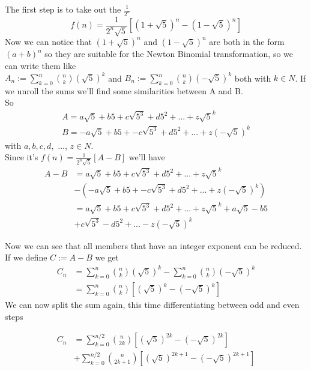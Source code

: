 \documentclass[amsmath,amssymb,aps,pra,reprint,groupedaddress,showpacs]{revtex4-1}
\begin{document}
The first step is to take out the $\frac{1}{2^n}$
$$f(n) = \frac{1}{2^n\sqrt{5}} \left[ \left( 1+\sqrt{5} \right) ^n - \left( 1-\sqrt{5} \right)^n \right]$$
Now we can notice that $(1 + \sqrt{5})^n$ and $(1 - \sqrt{5})^n$ are both in the form $(a + b)^n$ so they are suitable for the Newton Binomial transformation,
so we can write them like \\
$ A_n:= \sum_{k=0}^n \binom{n}{k} \left(\sqrt{5} \right) ^k $ and $ B_n:= \sum_{k=0}^n \binom{n}{k} \left( -\sqrt{5} \right) ^k $ both with $k \in N$.
If we unroll the sums we'll find some similarities between A and B.\\
So
\begin{gather*}
A = a\sqrt{5} +b5 + c\sqrt{5^3} + d5^2 + ... + z\sqrt{ 5 }^k \\
B = -a\sqrt{5} +b5 + -c\sqrt{5^3} + d5^2 + ... + z \left( -\sqrt{5} \right) ^k
\end{gather*} 
with $a, b, c, d,$  ..., $z \in N$. \\

Since it's $f(n)=\frac{1}{2^n\sqrt{5}} \left[ A - B \right]$ we'll have
\begin{align*}
A - B &= a\sqrt{5} +b5 + c\sqrt{5^3} + d5^2 + ... + z\sqrt{5}^k  \\
&- \left( -a\sqrt{5} +b5 + -c\sqrt{5^3} + d5^2 + ... + z \left( -\sqrt{5} \right)^k \right) \\
&= a\sqrt{5} +b5 + c\sqrt{5^3} + d5^2 + ... + z\sqrt{5}^k +a\sqrt{5} -b5 \\
&+ c\sqrt{5^3} - d5^2 + ... - z \left( -\sqrt{5} \right) ^k
\end{align*}

Now we can see that all members that have an integer exponent can be reduced. If we define $C:= A - B$ we get
\begin{align*}
C_n &= \sum_{k=0}^n \binom{n}{k} \left(\sqrt{5} \right) ^k - \sum_{k=0}^n \binom{n}{k} \left(-\sqrt{5} \right) ^k\\
&= \sum_{k=0}^n \binom{n}{k} \left[ \left(\sqrt{5} \right) ^k - \left(-\sqrt{5} \right) ^k \right]
\end{align*}
We can now split the sum again, this time differentiating between odd and even steps

\begin{align*}
C_n &= \sum_{k=0}^{n/2} \binom{n}{2k} \left[ \left(\sqrt{5} \right) ^{2k} - \left(-\sqrt{5} \right) ^{2k} \right]\\
&+ \sum_{k=0}^{n/2} \binom{n}{2k + 1} \left[ \left(\sqrt{5} \right) ^{2k + 1} - \left(-\sqrt{5} \right) ^{2k +1} \right]
\end{align*}
\end{document}
